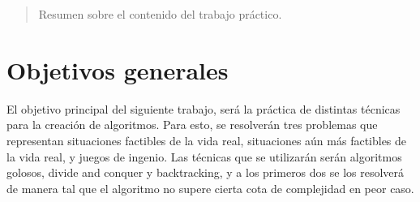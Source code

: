 \documentclass[a4paper]{article}
\begin{document}

\thispagestyle{empty}

\maketitle
\newpage

\thispagestyle{empty}
\vfill
\begin{abstract}
    \vspace{0.5cm}
    Resumen sobre el contenido del trabajo práctico.
\end{abstract}

\thispagestyle{empty}
\vspace{1.5cm}
\tableofcontents
\newpage


\newpage
\section{Objetivos generales}

El objetivo principal del siguiente trabajo, será la práctica de distintas técnicas para la creación de algoritmos. Para esto, se resolverán tres problemas que representan situaciones factibles de la vida real, situaciones aún más factibles de la vida real, y juegos de ingenio. Las técnicas que se utilizarán serán algoritmos golosos, divide and conquer y backtracking, y a los primeros dos se los resolverá de manera tal que el algoritmo no supere cierta cota de complejidad en peor caso.
\end{document}
